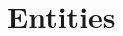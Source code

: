 \documentclass{article}
\begin{document}
    \section{Entities}\label{sec:entities}

    \begin{adjustbox}{width=\textwidth}
        
    \end{adjustbox}
\end{document}
